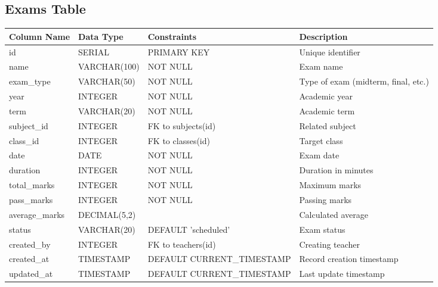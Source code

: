\documentclass[11pt,a4paper]{article}
\begin{document}
\subsection{Exams Table}
\begin{longtable}{|p{3cm}|p{3cm}|p{2cm}|p{6cm}|}
\hline
\textbf{Column Name} & \textbf{Data Type} & \textbf{Constraints} & \textbf{Description} \\
\hline
\endhead
id & SERIAL & PRIMARY KEY & Unique identifier \\
\hline
name & VARCHAR(100) & NOT NULL & Exam name \\
\hline
exam\_type & VARCHAR(50) & NOT NULL & Type of exam (midterm, final, etc.) \\
\hline
year & INTEGER & NOT NULL & Academic year \\
\hline
term & VARCHAR(20) & NOT NULL & Academic term \\
\hline
subject\_id & INTEGER & FK to subjects(id) & Related subject \\
\hline
class\_id & INTEGER & FK to classes(id) & Target class \\
\hline
date & DATE & NOT NULL & Exam date \\
\hline
duration & INTEGER & NOT NULL & Duration in minutes \\
\hline
total\_marks & INTEGER & NOT NULL & Maximum marks \\
\hline
pass\_marks & INTEGER & NOT NULL & Passing marks \\
\hline
average\_marks & DECIMAL(5,2) & & Calculated average \\
\hline
status & VARCHAR(20) & DEFAULT 'scheduled' & Exam status \\
\hline
created\_by & INTEGER & FK to teachers(id) & Creating teacher \\
\hline
created\_at & TIMESTAMP & DEFAULT CURRENT\_TIMESTAMP & Record creation timestamp \\
\hline
updated\_at & TIMESTAMP & DEFAULT CURRENT\_TIMESTAMP & Last update timestamp \\
\hline
\end{longtable}
\end{document}
